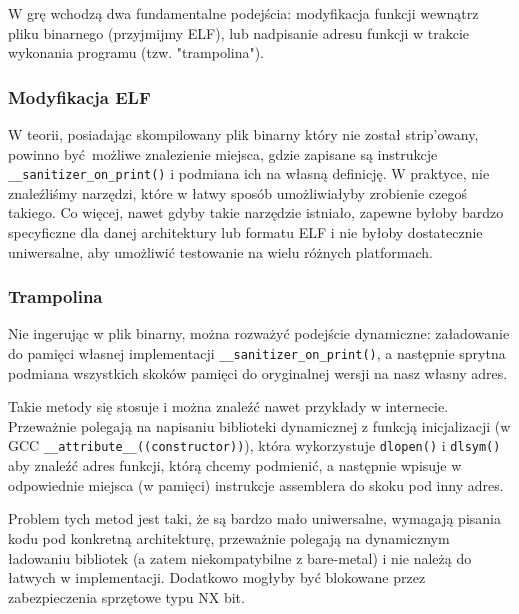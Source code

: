 \documentclass[../main.tex]{subfiles}
\begin{document}
W grę wchodzą dwa fundamentalne podejścia: modyfikacja funkcji wewnątrz pliku
binarnego (przyjmijmy ELF), lub nadpisanie adresu funkcji w trakcie wykonania
programu (tzw. "trampolina").

\subsubsection{Modyfikacja ELF}
W teorii, posiadając skompilowany plik binarny który nie został strip'owany,
powinno być możliwe znalezienie miejsca, gdzie zapisane są instrukcje \\
\texttt{__sanitizer_on_print()} i podmiana ich na własną definicję. W
praktyce, nie znaleźliśmy narzędzi, które w łatwy sposób umożliwiałyby
zrobienie czegoś takiego. Co więcej, nawet gdyby takie narzędzie istniało,
zapewne byłoby bardzo specyficzne dla danej architektury lub formatu ELF i nie
byłoby dostatecznie uniwersalne, aby umożliwić testowanie na wielu różnych
platformach.

\subsubsection{Trampolina}
Nie ingerując w plik binarny, można rozważyć podejście dynamiczne: załadowanie
do pamięci własnej implementacji \texttt{__sanitizer_on_print()}, a
następnie sprytna podmiana wszystkich skoków pamięci do oryginalnej wersji na
nasz własny adres.

Takie metody się stosuje i można znaleźć nawet przykłady w internecie.
Przeważnie polegają na napisaniu biblioteki dynamicznej z funkcją inicjalizacji
(w GCC \texttt{__attribute__((constructor))}), która wykorzystuje
\texttt{dlopen()} i \texttt{dlsym()} aby znaleźć adres funkcji,
którą chcemy podmienić, a następnie wpisuje w odpowiednie miejsca (w pamięci)
instrukcje assemblera do skoku pod inny adres.

Problem tych metod jest taki, że są bardzo mało uniwersalne, wymagają pisania
kodu pod konkretną architekturę, przeważnie polegają na dynamicznym ładowaniu
bibliotek (a zatem niekompatybilne z bare-metal) i nie należą do łatwych w
implementacji. Dodatkowo mogłyby być blokowane przez zabezpieczenia sprzętowe
typu NX bit.
\end{document}
